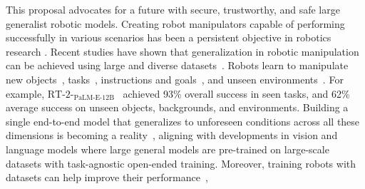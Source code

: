 This proposal advocates for a future with secure, trustworthy, and safe large generalist robotic models.
Creating robot manipulators capable of performing successfully in various scenarios has been a persistent objective in robotics research \cite{kaelbling2020foundation,9,rt-1,rt-2,zhang2024vla}. 
Recent studies have shown that generalization in robotic manipulation can be achieved using large and diverse datasets~\cite{pinto2016supersizing,kaelbling2020foundation,levine2018learning,xu2025vla,arai2025covla}. 
Robots learn to manipulate new objects~\cite{pinto2016supersizing,levine2018learning,finn2017deep,young2021visual,9},  tasks~\cite{james2018task,dasari2021transformers,jang2022bc,9},  instructions and goals~\cite{nair2022learning,jang2022bc,jiang2023vima,mees2022matters}, and unseen environments~\cite{hansen2020self,cui2022play,9}. 
For example, $\text{RT-2-}_\text{PaLM-E-12B}$~\cite{rt-2} achieved {93}\% overall success in seen tasks, and {62}\% average success on unseen objects, backgrounds, and environments. 
Building a single end-to-end model that generalizes to unforeseen conditions across all these dimensions is becoming a reality~\cite{rt-1,rt-2,9,wen2025tinyvla,xu2025vla}, aligning with developments in vision and language models where large general models are pre-trained on large-scale datasets with task-agnostic open-ended training. Moreover, training robots with \xot datasets can help improve their performance~\cite{9},

